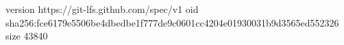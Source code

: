 version https://git-lfs.github.com/spec/v1
oid sha256:fce6179e5506be4dbedbe1f777de9c0601cc4204e01930031b9d3565ed552326
size 43840
